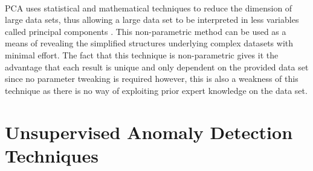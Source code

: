 
\paragraph{ } \acs{PCA} uses statistical and mathematical techniques to reduce the dimension of large data sets, thus allowing a large data set to be interpreted in less variables called principal components \cite{Richardson2009}. This non-parametric method can be used as a means of revealing the simplified structures underlying complex datasets with minimal effort. The fact that this technique is non-parametric gives it the advantage that each result is unique and only dependent on the provided data set since no parameter tweaking is required \cite{Shlens2014} however, this is also a weakness of this technique as there is no way of exploiting prior expert knowledge on the data set.




\section{Unsupervised Anomaly Detection Techniques}